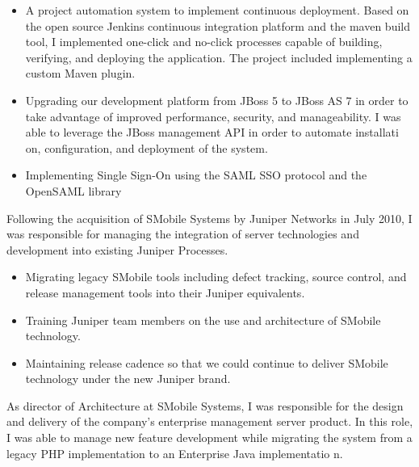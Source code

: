 \documentclass[12pt,letter,sans]{moderncv}
\begin{document}
\begin{itemize}

    \item A project automation system to implement continuous deployment.
        Based on the open source Jenkins continuous integration platform and the
        maven build tool, I implemented one-click and no-click processes capable
        of building, verifying, and deploying the application.
        The project included implementing a custom Maven plugin.

    \item
        Upgrading our development platform from JBoss 5 to JBoss AS 7 in order
        to take advantage of improved performance, security, and manageability.
        I was able to leverage the JBoss management API in order to automate installati
        on, configuration, and deployment of the system.

    \item
        Implementing Single Sign-On using the SAML SSO protocol and the OpenSAML
        library

\end{itemize}


Following the acquisition of SMobile Systems by Juniper Networks in July
2010, I was responsible for managing the integration of server technologies
and development into existing Juniper Processes.

\begin{itemize}
    \item
        Migrating legacy SMobile tools including defect tracking, source control,
        and release management tools into their Juniper equivalents.
    \item
        Training Juniper team members on the use and architecture of SMobile technology.
    \item
        Maintaining release cadence so that we could continue to deliver SMobile
        technology under the new Juniper brand.
\end{itemize}


As director of Architecture at SMobile Systems, I was responsible for the
design and delivery of the company's enterprise management server product.
In this role, I was able to manage new feature development while migrating
the system from a legacy PHP implementation to an Enterprise Java implementatio
n.
\end{document}
